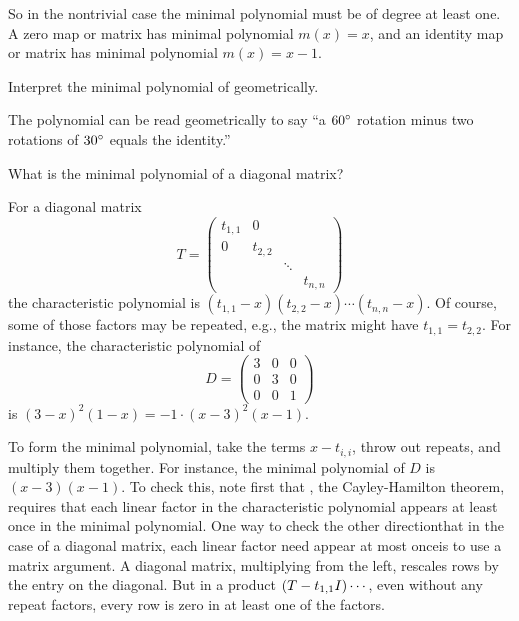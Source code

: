 \begin{exercises}
\begin{answer}
         So in the nontrivial case the minimal polynomial must be of degree
         at least one.
         A zero map or matrix has minimal polynomial \( m(x)=x \), and an
         identity map or matrix has minimal polynomial \( m(x)=x-1 \). 
       \end{answer}
  \recommended \item 
     Interpret the minimal polynomial of 
      geometrically.
     \begin{answer}
       The polynomial can be read geometrically to say ``a \( 60^\circ\relax \)
       rotation minus two rotations of \( 30^\circ\relax \) equals the
       identity.''
     \end{answer}
   \item 
     What is the minimal polynomial of a diagonal matrix?
     \begin{answer}
       For a diagonal matrix
       \begin{equation*}
          T=
          \begin{pmatrix}
             t_{1,1}   &0        \\
             0         &t_{2,2}  \\
                       &        &\ddots  \\
                       &        &      &t_{n,n}
          \end{pmatrix}
       \end{equation*}
       the characteristic polynomial is 
       $(t_{1,1}-x)(t_{2,2}-x)\cdots (t_{n,n}-x)$.     
       Of course, some of those factors may be repeated, e.g., the matrix might
       have $t_{1,1}=t_{2,2}$.
       For instance, the characteristic polynomial of
       \begin{equation*}
          D=
          \begin{pmatrix}
             3 &0 &0  \\
             0 &3 &0  \\
             0 &0 &1
          \end{pmatrix}
       \end{equation*}
       is \( (3-x)^2(1-x)=-1\cdot (x-3)^2(x-1) \). 

       To form the minimal polynomial, 
       take the terms \( x-t_{i,i} \), throw out repeats, 
       and multiply them together.
       For instance, the minimal polynomial of $D$
       is \( (x-3)(x-1) \).
       To check this, note first that , 
       the Cayley-Hamilton theorem, requires that each linear factor in the
       characteristic polynomial appears at least once in the minimal
       polynomial.
       One way to check the other direction\Dash that in the case of
       a diagonal matrix, 
       each linear factor need appear at most once\Dash is to
       use a matrix argument.
       A diagonal matrix, multiplying from the left, rescales rows by
       the entry on the diagonal.
       But in a product $(T-t_{1,1}I)\cdots\hbox{}$, even without any repeat
       factors, every row is zero in at least one of the factors. 


\end{answer}
\end{exercises}

